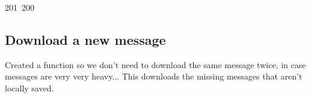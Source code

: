 201~200~\documentclass{article}
\begin{document}
	                                                                                                                                                                                                                                                                                                	                                                                                                                                        	    	                                                                                                	                                                                                            \subsection{Download a new message}

	                                                                                                                                                                                                                                                                                                	                                                                                                                                        	    	                                                                                                	                                                                                            Created a function so we don't need to download the same message twice, in case messages are very very heavy... This downloads the missing messages that aren't locally saved.
\end{document}
